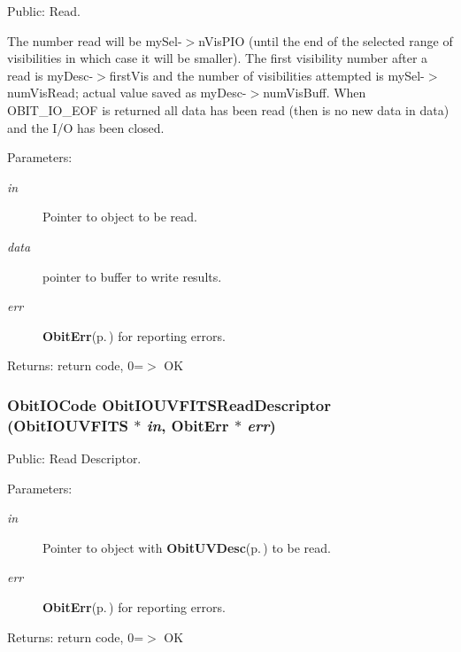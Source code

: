 Public: Read. 

The number read will be my\-Sel-$>$n\-Vis\-PIO (until the end of the selected range of visibilities in which case it will be smaller). The first visibility number after a read is my\-Desc-$>$first\-Vis and the number of visibilities attempted is my\-Sel-$>$num\-Vis\-Read; actual value saved as my\-Desc-$>$num\-Vis\-Buff. When OBIT\_\-IO\_\-EOF is returned all data has been read (then is no new data in data) and the I/O has been closed. \begin{Desc}
\item[Parameters:]
\begin{description}
\item[{\em in}]Pointer to object to be read. \item[{\em data}]pointer to buffer to write results. \item[{\em err}]{\bf Obit\-Err}{\rm (p.\,\pageref{structObitErr})} for reporting errors. \end{description}
\end{Desc}
\begin{Desc}
\item[Returns:]return code, 0=$>$ OK \end{Desc}
\subsubsection{\setlength{\rightskip}{0pt plus 5cm}Obit\-IOCode Obit\-IOUVFITSRead\-Descriptor ({\bf Obit\-IOUVFITS} $\ast$ {\em in}, {\bf Obit\-Err} $\ast$ {\em err})}\label{ObitIOUVFITS_8h_a21}


Public: Read Descriptor. 

\begin{Desc}
\item[Parameters:]
\begin{description}
\item[{\em in}]Pointer to object with {\bf Obit\-UVDesc}{\rm (p.\,\pageref{structObitUVDesc})} to be read. \item[{\em err}]{\bf Obit\-Err}{\rm (p.\,\pageref{structObitErr})} for reporting errors. \end{description}
\end{Desc}
\begin{Desc}
\item[Returns:]return code, 0=$>$ OK \end{Desc}
